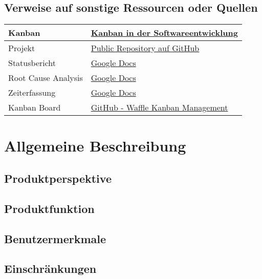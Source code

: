 \documentclass[a4paper]{book}
\begin{document}
\section{Verweise auf sonstige Ressourcen oder Quellen}
\begin{center}
\begin{tabular}{|p{3cm}|p{8cm}|}
\hline
Kanban & \href{http://de.wikipedia.org/wiki/Kanban_(Softwareentwicklung)}{Kanban in der Softwareentwicklung} \\
\hline
Projekt & \href{https://github.com/chronos38/libipc-}{Public Repository auf GitHub} \\
\hline
Statusbericht & \href{https://docs.google.com/document/d/12IZJyU6WJ3upd81pHYRQ8KWd34AJqNXi5WnBbJPOtIQ/edit?usp=sharing}{Google Docs} \\
\hline
Root Cause Analysis & \href{https://docs.google.com/document/d/16PQXzEqp1hANgkXX1qEbKkaIwQ57bTGZWJuKGO_t0wA/edit?usp=sharing}{Google Docs} \\
\hline
Zeiterfassung & \href{https://docs.google.com/spreadsheet/ccc?key=0AuApAQ4FqnCEdHdiWThZX2V5b1BsM2lWYWdWSzZNRVE&usp=sharing}{Google Docs} \\
\hline
Kanban Board & \href{https://waffle.io/chronos38/libipc-}{GitHub - Waffle Kanban Management} \\
\hline
\end{tabular}
\end{center}

\chapter{Allgemeine Beschreibung}
\blindtext

\section{Produktperspektive}
\blindtext

\section{Produktfunktion}
\blindtext

\section{Benutzermerkmale}
\blindtext

\section{Einschränkungen}
\blindtext
\end{document}
